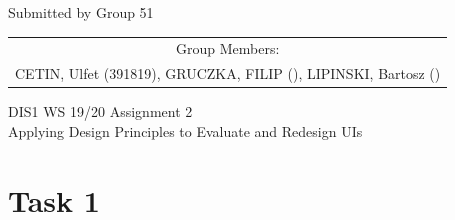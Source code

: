 \documentclass[a4paper,11pt,oneside]{scrreprt}
\begin{document}
\begin{center}
	Submitted by Group 51
	
	\bigskip
	
	\begin{tabular}{c}
	Group Members: \\
	CETIN, Ulfet (391819), GRUCZKA, FILIP (),	LIPINSKI, Bartosz () \\
	\end{tabular}

	\bigskip
	
	DIS1 WS 19/20 Assignment 2\\
	Applying Design Principles to Evaluate and Redesign UIs
	
\end{center}

\section*{Task 1}

%

\end{document}
